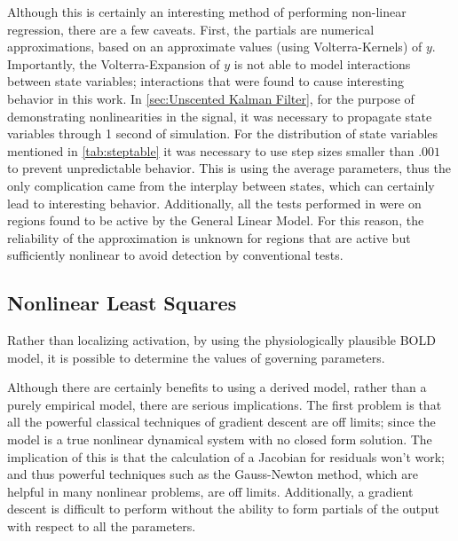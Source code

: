 Although this is certainly an interesting method of performing non-linear
regression, there are a few caveats. First, the partials are numerical
approximations, based on an approximate values (using Volterra-Kernels) of $y$.
Importantly, the Volterra-Expansion of $y$ is not able to model interactions
between state variables; interactions that were found to cause interesting
behavior in this work. In \autoref{sec:Unscented Kalman Filter}, for
the purpose of demonstrating nonlinearities in the signal, it was 
necessary to propagate state variables through 1 second of simulation.
For the distribution of state variables mentioned in \autoref{tab:steptable}
it was necessary to use step sizes smaller than $.001$ to prevent 
unpredictable behavior. This is using the average parameters, thus the
only complication came from the interplay between states, which can 
certainly lead to interesting behavior. Additionally, all the tests performed
in \cite{Friston2002b} were on regions found to be active by the General
Linear Model. For this reason, the reliability of the approximation is unknown
for regions that are active but
sufficiently nonlinear to avoid detection by conventional tests.

\subsection{Nonlinear Least Squares}
\label{sec:Nonlinear Least Squares}
Rather than localizing activation, by using the physiologically
plausible BOLD model, it is possible to determine the values of
governing parameters.

Although there are certainly benefits to using a derived model, rather
than a purely empirical model, there are serious implications. The
first problem is that all the powerful classical techniques of gradient
descent are off limits; since the model is a true nonlinear dynamical
system with no closed form solution. The implication of this is that
the calculation of a Jacobian for residuals won't work; and thus powerful
techniques such as the Gauss-Newton method, which are helpful in many nonlinear
problems, are off limits. Additionally, a gradient descent is difficult to
perform without the ability to form partials of the output with respect
to all the parameters. 

